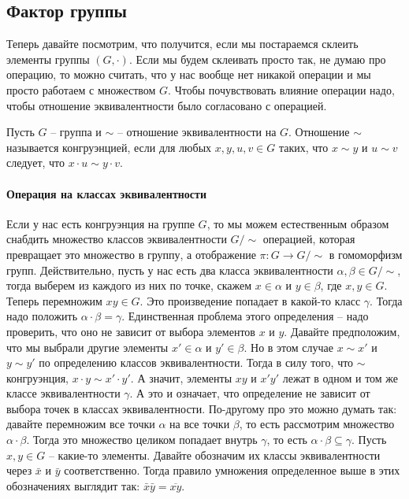 \subsection{Фактор группы}

Теперь давайте посмотрим, что получится, если мы постараемся склеить элементы группы $(G, \cdot)$.
Если мы будем склеивать просто так, не думаю про операцию, то можно считать, что у нас вообще нет никакой операции и мы просто работаем с множеством $G$.
Чтобы почувствовать влияние операции надо, чтобы отношение эквивалентности было согласовано с операцией.

\begin{definition}
Пусть $G$ -- группа и $\sim$ -- отношение эквивалентности на $G$.
Отношение $\sim$ называется конгруэнцией, если для любых $x,y,u,v\in G$ таких, что $x\sim y$ и $u\sim v$ следует, что $x \cdot u \sim y \cdot v$.
\end{definition}

\paragraph{Операция на классах эквивалентности}

Если у нас есть конгруэнция на группе $G$, то мы можем естественным образом снабдить множество классов эквивалентности $G/{\sim}$ операцией, которая превращает это множество в группу, а отображение $\pi \colon G\to G/{\sim}$ в гомоморфизм групп.
Действительно, пусть у нас есть два класса эквивалентности $\alpha,\beta\in G/{\sim}$, тогда выберем из каждого из них по точке, скажем $x\in \alpha$ и $y\in \beta$, где $x,y\in G$.
Теперь перемножим $xy\in G$.
Это произведение попадает в какой-то класс $\gamma$.
Тогда надо положить $\alpha\cdot \beta=\gamma$.
Единственная проблема этого определения -- надо проверить, что оно не зависит от выбора элементов $x$ и  $y$.
Давайте предположим, что мы выбрали другие элементы $x'\in \alpha$ и $y'\in \beta$.
Но в этом случае $x\sim x'$ и $y\sim y'$ по определению классов эквивалентности.
Тогда в силу того, что $\sim$ конгруэнция, $x\cdot y \sim x' \cdot y'$.
А значит, элементы $xy$ и $x'y'$ лежат в одном и том же классе эквивалентности $\gamma$.
А это и означает, что определение не зависит от выбора точек в классах эквивалентности.
По-другому про это можно думать так: давайте перемножим все точки $\alpha$ на все точки $\beta$, то есть рассмотрим множество $\alpha \cdot \beta$.
Тогда это множество целиком попадает внутрь $\gamma$, то есть $\alpha \cdot \beta \subseteq \gamma$.
Пусть $x,y\in G$ -- какие-то элементы.
Давайте обозначим их классы эквивалентности через $\bar x$ и $\bar y$ соответственно.
Тогда правило умножения определенное выше в этих обозначениях выглядит так: $\bar x  \bar y = \overline{xy}$.

